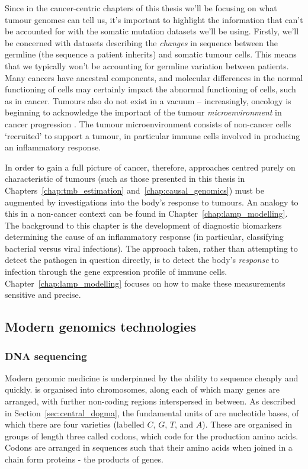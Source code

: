 \documentclass[thesis.tex]{subfiles}
\begin{document}
Since in the cancer-centric chapters of this thesis we'll be focusing on what tumour genomes can tell us, it's important to highlight the information that can't be accounted for with the somatic mutation datasets we'll be using. Firstly, we'll be concerned with datasets describing the \emph{changes} in  sequence between the germline (the  sequence a patient inherits) and somatic tumour cells. This means that we typically won't be accounting for germline variation between patients. Many cancers have ancestral components, and molecular differences in the normal functioning of cells may certainly impact the abnormal functioning of cells, such as in cancer. Tumours also do not exist in a vacuum -- increasingly, oncology is beginning to acknowledge the important of the tumour \emph{microenvironment} in cancer progression \citep{whiteside_tumor_2008}. The tumour microenvironment consists of non-cancer cells `recruited' to support a tumour, in particular immune cells involved in producing an inflammatory response.

In order to gain a full picture of cancer, therefore, approaches centred purely on characteristic of tumours (such as those presented in this thesis in Chapters~\ref{chap:tmb_estimation} and~\ref{chap:causal_genomics}) must be augmented by investigations into the body's response to tumours. An analogy to this in a non-cancer context can be found in Chapter~\ref{chap:lamp_modelling}. The background to this chapter is the development of diagnostic biomarkers determining the cause of an inflammatory response (in particular, classifying bacterial versus viral infections). The approach taken, rather than attempting to detect the pathogen in question directly, is to detect the body's \emph{response} to infection through the gene expression profile of immune cells. Chapter~\ref{chap:lamp_modelling} focuses on how to make these measurements sensitive and precise.

\subsection{Modern genomics technologies} \label{sec:sequencing}
\subsubsection{DNA sequencing}
Modern genomic medicine is underpinned by the ability to sequence  cheaply and quickly.  is organised into chromosomes, along each of which many genes are arranged, with further non-coding regions interspersed in between. As described in Section~\ref{sec:central_dogma}, the fundamental units of  are nucleotide bases, of which there are four varieties (labelled $C$, $G$, $T$, and $A$). These are organised in groups of length three called codons, which code for the production amino acids. Codons are arranged in sequences such that their amino acids when joined in a chain form proteins - the products of genes. 
\end{document}
